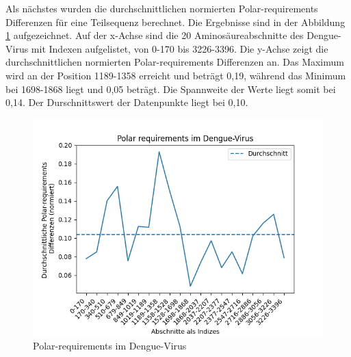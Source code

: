 \documentclass[german,version-2022-01]{uzl-thesis}
\begin{document}
Als n\"achstes wurden die durchschnittlichen normierten Polar-requirements Differenzen f\"ur eine Teilsequenz berechnet. Die Ergebnisse sind in der Abbildung \ref{fig:Dengue_virus_polar_requirements} aufgezeichnet. Auf der x-Achse sind die 20 Aminos\"aureabschnitte des Dengue-Virus mit Indexen aufgelistet, von 0-170 bis 3226-3396. Die y-Achse zeigt die durchschnittlichen normierten Polar-requirements Differenzen an. Das Maximum wird an der Position 1189-1358 erreicht und betr\"agt 0,19, w\"ahrend das Minimum bei 1698-1868 liegt und 0,05 betr\"agt. Die Spannweite der Werte liegt somit bei 0,14. Der Durschnittswert der Datenpunkte liegt bei 0,10. 
\begin{figure}[tbp]
  \centering
  \includegraphics[scale=0.75]{Images/Diagramm_Polar_requirements_im_Dengue_virus.png}
  \caption{Polar-requirements im Dengue-Virus}
  \label{fig:Dengue_virus_polar_requirements}
\end{figure}
\end{document}
